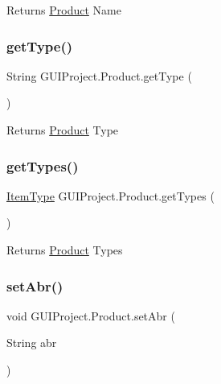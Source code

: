 \begin{DoxyReturn}{Returns}
\mbox{\hyperlink{class_g_u_i_project_1_1_product}{Product}} Name 
\end{DoxyReturn}
\mbox{\label{class_g_u_i_project_1_1_product_a5014b63cd8200fdd0bd65745ed15cbf6}} 
\subsubsection{\texorpdfstring{getType()}{getType()}}
{\footnotesize\ttfamily String G\+U\+I\+Project.\+Product.\+get\+Type (\begin{DoxyParamCaption}{ }\end{DoxyParamCaption})}

\begin{DoxyReturn}{Returns}
\mbox{\hyperlink{class_g_u_i_project_1_1_product}{Product}} Type 
\end{DoxyReturn}
\mbox{\label{class_g_u_i_project_1_1_product_a7b6a8245f27af140c01d24dc47b591d1}} 
\subsubsection{\texorpdfstring{getTypes()}{getTypes()}}
{\footnotesize\ttfamily \mbox{\hyperlink{enum_g_u_i_project_1_1_item_type}{Item\+Type}} G\+U\+I\+Project.\+Product.\+get\+Types (\begin{DoxyParamCaption}{ }\end{DoxyParamCaption})}

\begin{DoxyReturn}{Returns}
\mbox{\hyperlink{class_g_u_i_project_1_1_product}{Product}} Types 
\end{DoxyReturn}
\mbox{\label{class_g_u_i_project_1_1_product_aa61085427c21c7acf8498243e4b17729}} 
\subsubsection{\texorpdfstring{setAbr()}{setAbr()}}
{\footnotesize\ttfamily void G\+U\+I\+Project.\+Product.\+set\+Abr (\begin{DoxyParamCaption}\item[{String}]{abr }\end{DoxyParamCaption})}


